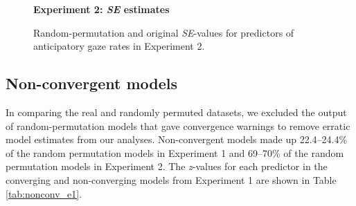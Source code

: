 \documentclass[authoryear, 12pt]{elsarticle}
\begin{document}
\begin{figure}
  \centering
  \textbf{Experiment 2: \textit{SE} estimates}\par\medskip
  \hfill
  \caption{Random-permutation and original \textit{SE}-values for predictors of anticipatory gaze rates in Experiment 2.}
\label{fig:E2-SEs}
\end{figure}

\clearpage

\subsection{Non-convergent models}
In comparing the real and randomly permuted datasets, we excluded the output of random-permutation models that gave convergence warnings to remove erratic model estimates from our analyses. Non-convergent models made up 22.4--24.4\% of the random permutation models in Experiment 1 and 69--70\% of the random permutation models in Experiment 2. The \textit{z}-values for each predictor in the converging and non-converging models from Experiment 1 are shown in Table \ref{tab:nonconv_e1}.
\end{document}

